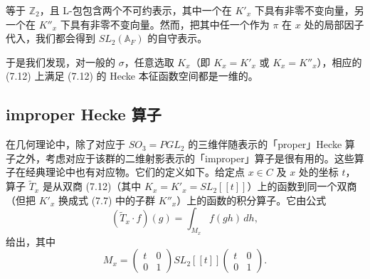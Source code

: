 \documentclass[11pt,a4paper]{article}
\begin{document}

等于 $\mathbb{Z}_2$，且 L-包包含两个不可约表示，其中一个在 $K'_x$ 下具有非零不变向量，另一个在 $K''_x$ 下具有非零不变向量。然而，把其中任一个作为 $\pi$ 在 $x$ 处的局部因子代入，我们都会得到 $SL_2(\mathbb{A}_F)$ 的自守表示。

于是我们发现，对一般的 $\sigma$，任意选取 $K_x$（即 $K_x=K'_x$ 或 $K_x=K''_x$），相应的 (7.12) 上满足 (7.12) 的 Hecke 本征函数空间都是一维的。

\subsection{improper Hecke 算子}

在几何理论中，除了对应于 $SO_3=PGL_2$ 的三维伴随表示的「proper」Hecke 算子之外，考虑对应于该群的二维射影表示的「improper」算子是很有用的。这些算子在经典理论中也有对应物。它们的定义如下。给定点 $x\in C$ 及 $x$ 处的坐标 $t$，算子 $\widetilde{T}_x$ 是从双商 (7.12)（其中 $K_x=K'_x=SL_2[[t]]$）上的函数到同一个双商（但把 $K'_x$ 换成式 (7.7) 中的子群 $K''_x$）上的函数的积分算子。它由公式
\begin{equation}\tag{7.14}
(\widetilde{T}_x\cdot f)(g)=\int_{M_x}f(gh)\,dh,
\end{equation}
给出，其中
\[
M_x=\begin{pmatrix}t&0\\ 0&1\end{pmatrix}SL_2[[t]]\begin{pmatrix}t&0\\ 0&1\end{pmatrix}.
\]
\end{document}
